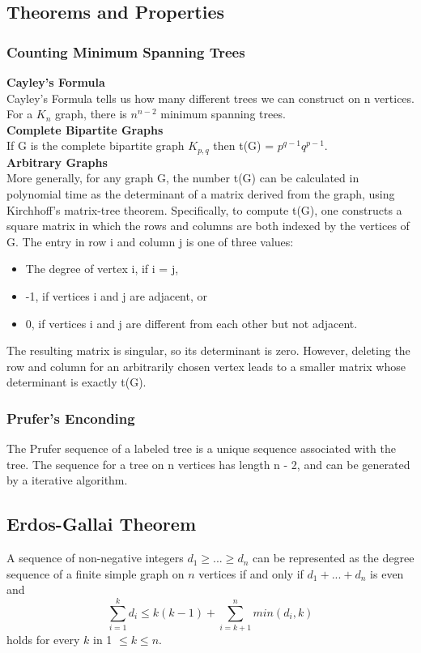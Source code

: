 \documentclass[10pt, twocolumn]{article}
\begin{document}
\begin{flushleft}
\subsection{Theorems and Properties}
\subsubsection{Counting Minimum Spanning Trees}
\textbf{Cayley's Formula}\\
Cayley’s Formula tells us how many different trees we can construct on n vertices.
For a $K_n$ graph, there is $n^{n-2}$ minimum spanning trees.\\[0.2cm]

\textbf{Complete Bipartite Graphs}\\
If G is the complete bipartite graph $K_{p,q}$ then t(G) = $p^{q-1}q^{p-1}$.\\[0.2cm]


\textbf{Arbitrary Graphs}\\
More generally, for any graph G, the number t(G) can be calculated in polynomial time as the determinant of a matrix derived from the graph, using Kirchhoff's matrix-tree theorem. Specifically, to compute t(G), one constructs a square matrix in which the rows and columns are both indexed by the vertices of G. The entry in row i and column j is one of three values:
\begin{itemize}
\item The degree of vertex i, if i = j,
\item -1, if vertices i and j are adjacent, or
\item 0, if vertices i and j are different from each other but not adjacent.
\end{itemize}
The resulting matrix is singular, so its determinant is zero. However, deleting the row and column for an arbitrarily chosen vertex leads to a smaller matrix whose determinant is exactly t(G).\\[0.2cm]

\subsubsection{Prufer's Enconding}
The Prufer sequence of a labeled tree is a unique sequence associated with the tree. The sequence for a tree on n vertices has length n - 2, and can be generated by a iterative algorithm.

\subsection{Erdos-Gallai Theorem}
A sequence of non-negative integers $d_1 \geq ... \geq d_n$ can be represented as the degree sequence of a finite simple graph on $n$ vertices if and only if $d_1 + ... + d_n$ is even and
$$\sum_{i=1}^{k} d_i \leq k(k-1) + \sum_{i=k+1}^{n} min(d_i, k)$$
holds for every $k$ in 1 $\leq k \leq n$.




\end{flushleft}
\end{document}
